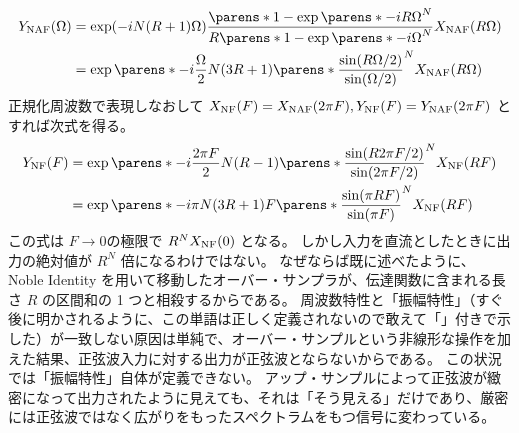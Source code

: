         \begin{align*}
            \YNAF(\Omega) &= \exp(-iN(R+1)\Omega)\frac{\parens*{1-\exp\parens*{-iR\Omega}}^N}{R\parens*{1-\exp\parens*{-i\Omega}}^N}\XNAF(R\Omega) \\
            &= \exp\parens*{-i\frac{\Omega}{2}N(3R+1)}\parens*{\frac{\sin(R\Omega/2)}{\sin(\Omega/2)}}^N \XNAF(R\Omega)
        \end{align*}
        正規化周波数で表現しなおして $X_\text{NF}(F) = X_\text{NAF}(2\pi F), Y_\text{NF}(F) = Y_\text{NAF}(2\pi F)$ とすれば次式を得る。
        \begin{align}
            \YNF(F) &= \exp\parens*{-i\frac{2\pi F}{2}N(R-1)}\parens*{\frac{\sin(R 2\pi F/2)}{\sin(2\pi F/2)}}^N \XNF(R F) \nonumber \\
            &= \exp\parens*{-i\pi N(3R+1)F}\parens*{\frac{\sin(\pi R F)}{\sin(\pi F)}}^N \XNF(R F) \label{equation:CIC up-sampler の周波数特性}
        \end{align}
        この式は $F\to 0$の極限で $R^N X_\text{NF}(0)$ となる。
        しかし入力を直流としたときに出力の絶対値が $R^N$ 倍になるわけではない。
        なぜならば既に述べたように、 Noble Identity を用いて移動したオーバー・サンプラが、伝達関数に含まれる長さ $R$ の区間和の 1 つと相殺するからである。
        周波数特性と「振幅特性」（すぐ後に明かされるように、この単語は正しく定義されないので敢えて「」付きで示した）が一致しない原因は単純で、オーバー・サンプルという非線形な操作を加えた結果、正弦波入力に対する出力が正弦波とならないからである。
        この状況では「振幅特性」自体が定義できない。
        アップ・サンプルによって正弦波が緻密になって出力されたように見えても、それは「そう見える」だけであり、厳密には正弦波ではなく広がりをもったスペクトラムをもつ信号に変わっている。
